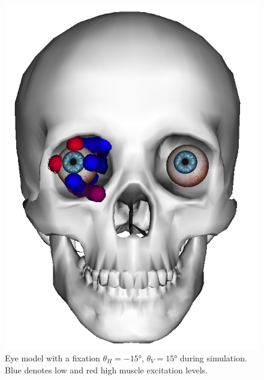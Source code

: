 \documentclass[11pt,a4paper,draft=false]{report}
\begin{document}
\begin{figure}[ht]
  \centering
  \includegraphics[width=.7\textwidth]{eye-model.png}
  \caption{Eye model with a fixation $\theta_H = -15 \si{\degree}$,
    $\theta_V = 15 \si{\degree}$ during simulation. Blue denotes low and red
    high muscle excitation levels.}\label{fig:model}
\end{figure}
\end{document}
